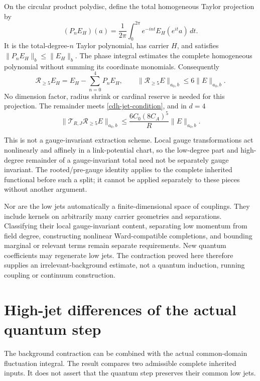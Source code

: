 \documentclass[11pt]{article}
\theoremstyle{remark}
\begin{document}
On the circular product polydisc, define the total homogeneous
Taylor projection by
\begin{equation}
 (P_nE_H)(a)=\frac1{2\pi}\int_0^{2\pi}
               e^{-int}E_H(e^{it}a)\,dt.
 \label{cdh-phase-projection}
\end{equation}
It is the total-degree-$n$ Taylor polynomial, has carrier
$H$, and satisfies $\|P_nE_H\|_b\leq\|E_H\|_b$.
The phase integral estimates the complete homogeneous
polynomial without summing its coordinate monomials.
Consequently
\begin{equation}
 \mathcal R_{\geq5}E_H
     =E_H-\sum_{n=0}^4P_nE_H,\qquad
 \|\mathcal R_{\geq5}E\|_{a_0,b}\leq6\|E\|_{a_0,b}.
 \label{cdh-projection-bound}
\end{equation}
No dimension factor, radius shrink or cardinal reserve is
needed for this projection. The remainder meets
\eqref{cdh-jet-condition}, and in $d=4$
\begin{equation}
 \|\mathcal T_{R,J}\mathcal R_{\geq5}E\|_{a_0,b}
 \leq\frac{6C_0(8C_A)^5}{R}\|E\|_{a_0,b}.
 \label{cdh-projected-bound}
\end{equation}

This is not a gauge-invariant extraction scheme. Local gauge
transformations act nonlinearly and affinely in a link-potential
chart, so the low-degree part and high-degree remainder of a
gauge-invariant total need not be separately gauge invariant.
The rooted/pre-gauge identity applies to the complete
inherited functional before such a split; it cannot be applied
separately to these pieces without another argument.

Nor are the low jets automatically a finite-dimensional space
of couplings. They include kernels on arbitrarily many carrier
geometries and separations. Classifying their local
gauge-invariant content, separating low momentum from field
degree, constructing nonlinear Ward-compatible completions,
and bounding marginal or relevant terms remain separate
requirements. New quantum coefficients may regenerate low
jets. The contraction proved here therefore supplies an
irrelevant-background estimate, not a quantum induction,
running coupling or continuum construction.

\section{High-jet differences of the actual quantum step}
\label{cdq-section}

The background contraction can be combined with the actual
common-domain fluctuation integral. The result compares two
admissible complete inherited inputs. It does not assert that
the quantum step preserves their common low jets.
\end{document}
